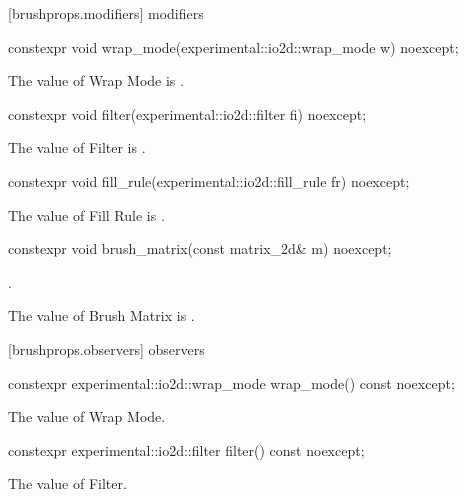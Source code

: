  [brushprops.modifiers] { modifiers}

\begin{itemdecl}
constexpr void wrap_mode(experimental::io2d::wrap_mode w) noexcept;
\end{itemdecl}
\begin{itemdescr}
\pnum
\effects
The value of Wrap Mode is .
\end{itemdescr}

\begin{itemdecl}
constexpr void filter(experimental::io2d::filter fi) noexcept;
\end{itemdecl}
\begin{itemdescr}
\pnum
\effects
The value of Filter is .
\end{itemdescr}

\begin{itemdecl}
constexpr void fill_rule(experimental::io2d::fill_rule fr) noexcept;
\end{itemdecl}
\begin{itemdescr}
\pnum
\effects
The value of Fill Rule is .
\end{itemdescr}

\begin{itemdecl}
constexpr void brush_matrix(const matrix_2d& m) noexcept;
\end{itemdecl}
\begin{itemdescr}
\pnum
\requires
{}.

\pnum
\effects
The value of Brush Matrix is .
\end{itemdescr}

 [brushprops.observers] { observers}

\begin{itemdecl}
constexpr experimental::io2d::wrap_mode wrap_mode() const noexcept;
\end{itemdecl}
\begin{itemdescr}
\pnum
\returns
The value of Wrap Mode.
\end{itemdescr}

\begin{itemdecl}
constexpr experimental::io2d::filter filter() const noexcept;
\end{itemdecl}
\begin{itemdescr}
\pnum
\returns
The value of Filter.
\end{itemdescr}

